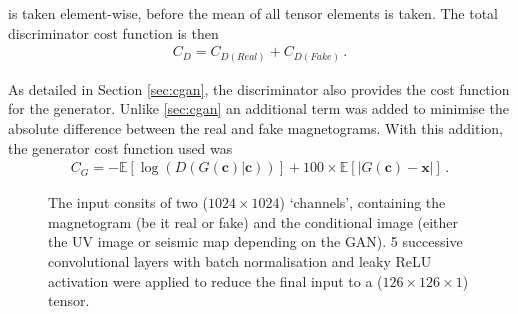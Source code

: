 \documentclass[11pt,a4paper,onecolumn]{report}
\begin{document}
is taken element-wise, before the mean of all tensor elements is taken. The
total discriminator cost function is then
\begin{align}
  C_{D} = C_{D(Real)} + C_{D(Fake)} \,. \label{eqn:d_loss}
\end{align}
\par
As detailed in Section \ref{sec:cgan}, the discriminator also provides the cost
function for the generator. Unlike \ref{sec:cgan} an additional term was added
to minimise the absolute difference between the real and fake magnetograms. With
this addition, the generator cost function used was
\begin{align}
  C_{G} = -\mathds{E}\left[\log(D(G(\mathbf{c})|\mathbf{c}))\right] +
  100 \times \mathds{E}\left[|G(\mathbf{c}) - \mathbf{x}|\right] \,.\label{eqn:G_loss}
\end{align}



\begin{figure}
  \centering
  \caption{
    The input consits of two ($1024\times 1024$) `channels', containing the
    magnetogram (be it real or fake) and the conditional image (either the UV
    image or seismic map depending on the GAN). 5 successive convolutional
    layers with batch normalisation and leaky ReLU activation were applied to
    reduce the final input to a ($126\times 126 \times 1$) tensor.
  }
  \label{fig:discrim_model}
\end{figure}
\end{document}
